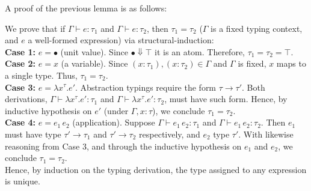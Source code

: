 \noindent
A proof of the previous lemma is as follows:
\begin{Proof}

    We prove that if $\Gamma \vdash e : \tau_1$ and $\Gamma \vdash e : \tau_2$, then $\tau_1 = \tau_2$ ($\Gamma$ is a fixed typing context, and $e$ a well-formed expression)
    via structural-induction:\\

    \noindent
    \textbf{Case 1:} $e = \bullet$ (unit value).  
    Since $\bullet\Downarrow\top$ it is an atom. Therefore, $\tau_1 = \tau_2 = \top$.
    \\

    \noindent
    \textbf{Case 2:} $e = x$ (a variable).  
    Since $(x : \tau_1), (x : \tau_2) \in \Gamma$ and $\Gamma$ is fixed, $x$ maps to a single type. Thus, $\tau_1 = \tau_2$.
    \\

    \noindent
    \textbf{Case 3:} $e = \lambda x^\tau. e'$.  
    Abstraction typings require the form $\tau \to \tau'$. Both derivations,
    $\Gamma \vdash \lambda x^\tau. e' : \tau_1$ and $\Gamma \vdash \lambda x^\tau. e' : \tau_2$,
    must have such form. Hence, by inductive hypothesis on $e'$ (under $\Gamma,x:\tau$), we conclude $\tau_1 = \tau_2$.
    \\ 

    \noindent
    \textbf{Case 4:} $e = e_1\, e_2$ (application).  
    Suppose $\Gamma \vdash e_1\, e_2 : \tau_1$ and $\Gamma \vdash e_1\, e_2 : \tau_2$.  
    Then $e_1$ must have type $\tau' \to \tau_1$ and $\tau' \to \tau_2$ respectively, and $e_2$ type $\tau'$.  
    With likewise reasoning from Case 3, and through the inductive hypothesis on $e_1$ and $e_2$, we conclude $\tau_1 = \tau_2$.
    \\

    \noindent
    Hence, by induction on the typing derivation, the type assigned to any expression is unique.

    \end{Proof}
        
    
